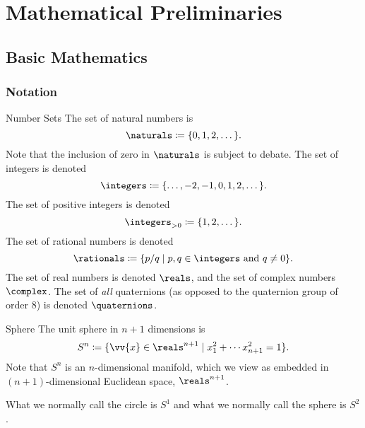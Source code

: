 \chapter{Mathematical Preliminaries}
\section{Basic Mathematics}
\subsection{Notation}
\begin{ntn}{Number Sets}{}
    The set of natural numbers is
    \begin{equation}
        \naturals \coloneqq \{0, 1, 2, \dotsc\}.
    \end{equation}
    Note that the inclusion of zero in \(\naturals\) is subject to debate.
    The set of integers is denoted
    \begin{equation}
        \integers \coloneqq \{\dotsc, -2, -1, 0, 1, 2, \dotsc\}.
    \end{equation}
    The set of positive integers is denoted
    \begin{equation}
        \positiveintegers \coloneqq \{1, 2, \dotsc\}.
    \end{equation}
    The set of rational numbers is denoted
    \begin{equation}
        \rationals \coloneqq \{p/q \mid p, q \in \integers \text{ and } q \ne 0\}.
    \end{equation}
    The set of real numbers is denoted \(\reals\), and the set of complex numbers \(\complex\).
    The set of \emph{all} quaternions (as opposed to the quaternion group of order 8) is denoted \(\quaternions\).
\end{ntn}

\begin{ntn}{Sphere}{}
    The unit sphere in \(n + 1\) dimensions is
    \begin{equation}
        S^n \coloneqq \{\vv{x} \in \reals^{n+1} \mid x_1^2 + \dotsb x_{n+1}^2 = 1\}.
    \end{equation}
    Note that \(S^n\) is an \(n\)-dimensional manifold, which we view as embedded in \((n + 1)\)-dimensional Euclidean space, \(\reals^{n+1}\).
    
    What we normally call the circle is \(S^1\) and what we normally call the sphere is \(S^2\).
\end{ntn}

